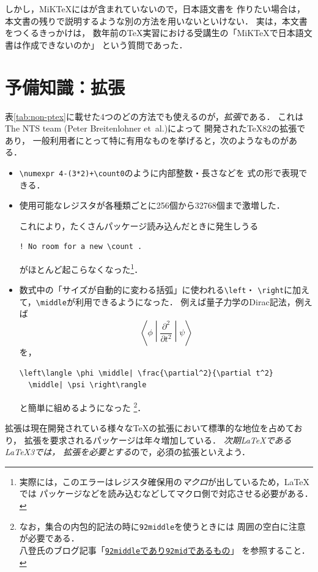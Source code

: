\documentclass[b5paper]{bxjsarticle} %
\begin{document}
しかし，MiK\TeX には\pLaTeX が含まれていないので，日本語文書を
作りたい場合は，本文書の残りで説明するような別の方法を用いないといけない．
実は，本文書をつくるきっかけは，
数年前の\TeX 実習における受講生の「MiK\TeX で日本語文書は作成できないのか」
という質問であった．



\newpage

\section{予備知識：\eTeX 拡張}
\label{sec:etex}
表\>\ref{tab:non-ptex}\>に載せた4つのどの方法でも使えるのが，\emph{\eTeX 拡張}である．
これはThe NTS team (Peter Breitenlohner et~al.)によって
開発された\TeX82の拡張であり，
一般利用者にとって特に有用なものを挙げると，次のようなものがある．
\begin{itemize}
\item \verb!\numexpr 4-(3*2)+\count0!のように内部整数・長さなどを
  式の形で表現できる．
\item 使用可能なレジスタが各種類ごとに256個から32768個まで激増した．

これにより，たくさんパッケージ読み込んだときに発生しうる
\begin{lstlisting}
! No room for a new \count .
\end{lstlisting}
がほとんど起こらなくなった\footnote{%
  実際には，このエラーはレジスタ確保用の\emph{マクロ}が出しているため，\LaTeX では
  パッケージなどを読み込むなどしてマクロ側で対応させる必要がある．
}．

\item 数式中の「サイズが自動的に変わる括弧」に使われる\verb+\left+・
  \verb+\right+に加えて，\verb+\middle+が利用できるようになった．
  例えば量子力学のDirac記法，例えば
\[
 \left\langle \phi \middle| \frac{\partial^2}{\partial t^2} \middle| \psi \right\rangle
\]
を，
\begin{lstlisting}
\left\langle \phi \middle| \frac{\partial^2}{\partial t^2}
  \middle| \psi \right\rangle
\end{lstlisting}
  と簡単に組めるようになった%
  \footnote{なお，集合の内包的記法の時に\texttt{\char92middle}を使うときには
  周囲の空白に注意が必要である．\\
  八登氏のブログ記事「\href{http://d.hatena.ne.jp/zrbabbler/20120411/1334151482}%
  {\texttt{\char92middle}であり\texttt{\char92mid}であるもの}」
  を参照すること．}．
\end{itemize}
\eTeX 拡張は現在開発されている様々な\TeX の拡張において標準的な地位を占めており，
\eTeX 拡張を要求されるパッケージは年々増加している．
\emph{次期\LaTeX である\LaTeX3では，
\eTeX 拡張を必要とする}ので，必須の拡張といえよう．
\end{document}
